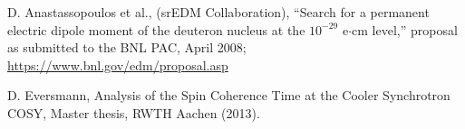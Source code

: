 \documentclass[a4paper]{jacow}
\begin{document}
\begin{thebibliography}{9}

	D. Anastassopoulos et al., (srEDM Collaboration), ``Search for a permanent electric dipole moment of the deuteron nucleus at the $10^{-29}$ e$\cdot$cm level,'' proposal as submitted to the BNL PAC, April 2008; \url{https://www.bnl.gov/edm/proposal.asp}
		
	D. Eversmann, Analysis of the Spin Coherence Time at the Cooler Synchrotron COSY, Master thesis, RWTH Aachen (2013).
	
	
	
	
\end{thebibliography}
\null
\end{document}

